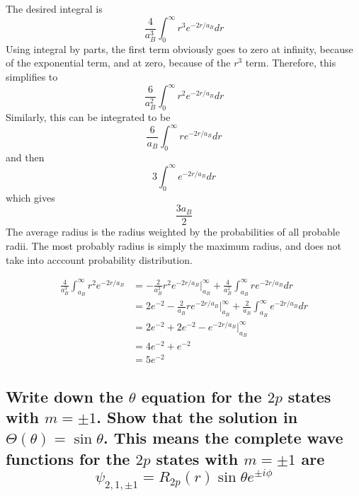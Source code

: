 \documentclass[answers]{exam}
\begin{document}
\begin{questions}
\begin{solution}
	The desired integral is
	$$\frac{4}{a^3_B}\int_0^\infty r^3e^{-2r/a_B}dr$$
	Using integral by parts, the first term obviously goes to zero at infinity, because of the exponential term, and at zero, because of the $r^3$ term. Therefore, this simplifies to
	$$\frac{6}{a^2_B}\int_0^\infty r^2e^{-2r/a_B}dr$$
	Similarly, this can be integrated to be
	$$\frac{6}{a_B}\int_0^\infty re^{-2r/a_B}dr$$
	and then
	$$3\int_0^\infty e^{-2r/a_B}dr$$
	which gives
	$$\frac{3a_B}{2}$$
	The average radius is the radius weighted by the probabilities of all probable radii. The most probably radius is simply the maximum radius, and does not take into acccount probability distribution.
\end{solution}


\begin{solution}
	\begin{align*}
		\frac{4}{a^3_B}\int_{a_B}^\infty r^2e^{-2r/a_B} &= -\frac{2}{a^2_B}r^2e^{-2r/a_B} \Big |_{a_B}^\infty + \frac{4}{a^2_B}\int_{a_B}^\infty re^{-2r/a_B}dr \\
								&= 2e^{-2} - \frac{2}{a_B}re^{-2r/a_B} \Big |_{a_B}^\infty + \frac{2}{a_B}\int_{a_B}^\infty e^{-2r/a_B}dr \\
								&= 2e^{-2} + 2e^{-2} - e^{-2r/a_B} \Big |_{a_B}^\infty \\
								&= 4e^{-2} + e^{-2} \\
								&= 5e^{-2}
	\end{align*}
\end{solution}

\question{}

\begin{parts}
	\part{Write down the $\theta$ equation for the $2p$ states with $m=\pm1$. Show that the solution in $\Theta(\theta) = \sin\theta$. This means the complete wave functions for the $2p$ states with $m=\pm1$ are
		$$\psi_{2,1,\pm1} = R_{2p}(r)\sin\theta e^{\pm i\phi}$$
	}


\end{parts}
\end{questions}
\end{document}
